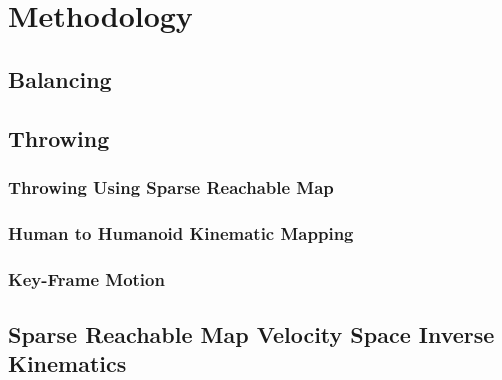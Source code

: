 \chapter{Methodology}


\section{Balancing}\label{sec:sec:balance}
	




\section{Throwing}\label{sec:baseball}
	
	
	\subsection{Throwing Using Sparse Reachable Map}\label{sec:sec:srm}
		

	\subsection{Human to Humanoid Kinematic Mapping}\label{sec:sec:mocap}
		

	\subsection{Key-Frame Motion}\label{sec:sec:keyframe}
		

\section{Sparse Reachable Map Velocity Space Inverse Kinematics}\label{sec:srm}
		
		
		
